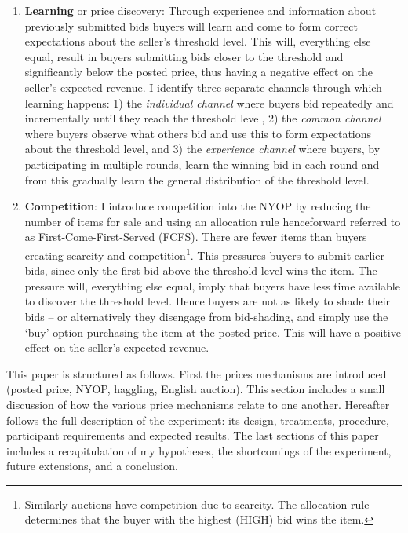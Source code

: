 \documentclass[a4paper,12pt]{article}
\begin{document}
	\begin{enumerate}
		\item {\bf Learning} or price discovery: Through experience and information about previously submitted bids buyers will learn and come to form correct expectations about the seller's threshold level. This will, everything else equal, result in buyers submitting bids closer to the threshold and significantly below the posted price, thus having a negative effect on the seller's expected revenue. I identify three separate channels through which learning happens: 1) the \emph{individual channel} where buyers bid repeatedly and incrementally until they reach the threshold level, 2) the \emph{common channel} where buyers observe what others bid and use this to form expectations about the threshold level, and 3) the \emph{experience channel} where buyers, by participating in multiple rounds, learn the winning bid in each round and from this gradually learn the general distribution of the threshold level.
	 	\item {\bf Competition}: I introduce competition into the NYOP by reducing the number of items for sale and using an allocation rule henceforward referred to as First-Come-First-Served (FCFS). There are fewer items than buyers creating scarcity and competition\footnote{Similarly auctions have competition due to scarcity. The allocation rule determines that the buyer with the highest (HIGH) bid wins the item.}. This pressures buyers to submit earlier bids, since only the first bid above the threshold level wins the item. The pressure will, everything else equal, imply that buyers have less time available to discover the threshold level. Hence buyers are not as likely to shade their bids -- or alternatively they disengage from bid-shading, and simply use the `buy' option purchasing the item at the posted price. This will have a positive effect on the seller's expected revenue.
	\end{enumerate}

	This paper is structured as follows. First the prices mechanisms are introduced (posted price, NYOP, haggling, English auction). This section includes a small discussion of how the various price mechanisms relate to one another. Hereafter follows the full description of the experiment: its design, treatments, procedure, participant requirements and expected results. The last sections of this paper includes a recapitulation of my hypotheses, the shortcomings of the experiment, future extensions, and a conclusion.
\end{document}
